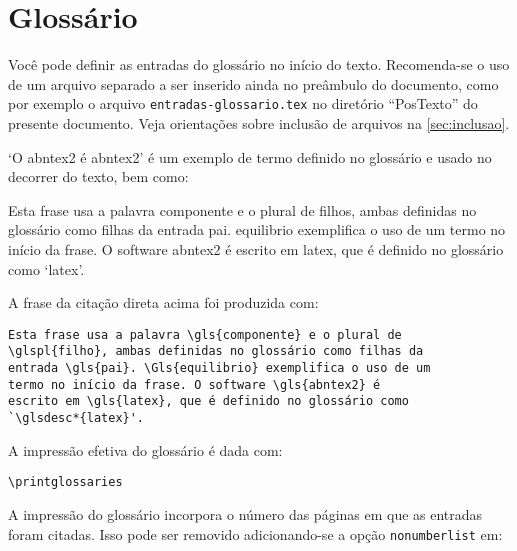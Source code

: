 \section{Glossário}\label{sec:glossario}

Você pode definir as entradas do glossário no início do texto. Recomenda-se o uso de um arquivo separado a ser inserido ainda no preâmbulo do documento, como por exemplo o arquivo \texttt{entradas-glossario.tex} no diretório ``PosTexto'' do presente documento. Veja orientações sobre inclusão de arquivos na \autoref{sec:inclusao}.

`O \gls{abntex2} é \glsdesc*{abntex2}' é um exemplo de termo definido no glossário e usado no decorrer do texto, bem como:

\begin{citacao}%
Esta frase usa a palavra \gls{componente} e o plural de \glspl{filho}, ambas definidas no glossário como filhas da entrada \gls{pai}. \Gls{equilibrio} exemplifica o uso de um termo no início da frase. O software \gls{abntex2} é escrito em \gls{latex}, que é definido no glossário como `\glsdesc*{latex}'.
\end{citacao}

A frase da citação direta acima foi produzida com:

\begin{SingleSpacing}%
\begin{verbatim}
Esta frase usa a palavra \gls{componente} e o plural de
\glspl{filho}, ambas definidas no glossário como filhas da
entrada \gls{pai}. \Gls{equilibrio} exemplifica o uso de um
termo no início da frase. O software \gls{abntex2} é
escrito em \gls{latex}, que é definido no glossário como
`\glsdesc*{latex}'.
\end{verbatim}
\end{SingleSpacing}

A impressão efetiva do glossário é dada com:

\begin{SingleSpacing}%
\begin{verbatim}
\printglossaries
\end{verbatim}
\end{SingleSpacing}

A impressão do glossário incorpora o número das páginas em que as entradas foram citadas. Isso pode ser removido adicionando-se a opção \texttt{nonumberlist} em:

